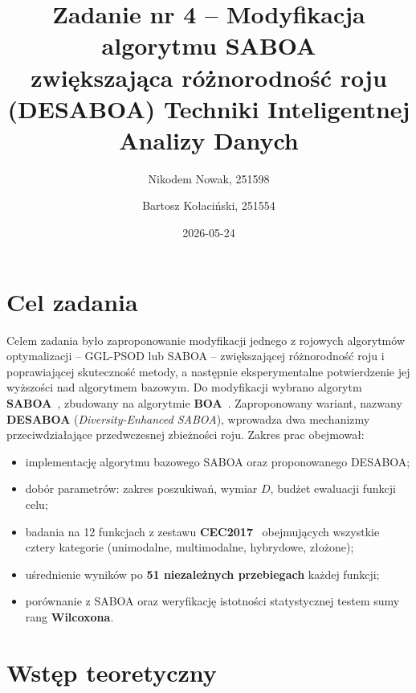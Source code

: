 \documentclass[12pt]{article}
\title{{\bf Zadanie nr 4 -- Modyfikacja algorytmu SABOA\\zwiększająca różnorodność roju (DESABOA)}\linebreak
Techniki Inteligentnej Analizy Danych}
\author{Nikodem Nowak, 251598 \and Bartosz Kołaciński, 251554}
\date{2026-05-24}
\begin{document}
\clearpage\maketitle
\thispagestyle{empty}
\newpage
\tableofcontents
\thispagestyle{empty}
\newpage
\setcounter{page}{1}

\section{Cel zadania}

Celem zadania było zaproponowanie modyfikacji jednego z rojowych algorytmów
optymalizacji -- GGL-PSOD lub SABOA -- zwiększającej różnorodność roju i poprawiającej
skuteczność metody, a następnie eksperymentalne potwierdzenie jej wyższości nad
algorytmem bazowym. Do modyfikacji wybrano algorytm \textbf{SABOA}~\cite{saboa},
zbudowany na algorytmie \textbf{BOA}~\cite{boa}. Zaproponowany wariant, nazwany
\textbf{DESABOA} (\emph{Diversity-Enhanced SABOA}), wprowadza dwa mechanizmy
przeciwdziałające przedwczesnej zbieżności roju. Zakres prac obejmował:
\begin{itemize}
  \item implementację algorytmu bazowego SABOA oraz proponowanego DESABOA;
  \item dobór parametrów: zakres poszukiwań, wymiar $D$, budżet ewaluacji funkcji celu;
  \item badania na 12 funkcjach z zestawu \textbf{CEC2017}~\cite{cec2017} obejmujących
        wszystkie cztery kategorie (unimodalne, multimodalne, hybrydowe, złożone);
  \item uśrednienie wyników po \textbf{51 niezależnych przebiegach} każdej funkcji;
  \item porównanie z SABOA oraz weryfikację istotności statystycznej testem sumy rang
        \textbf{Wilcoxona}.
\end{itemize}

\section{Wstęp teoretyczny}
\end{document}
